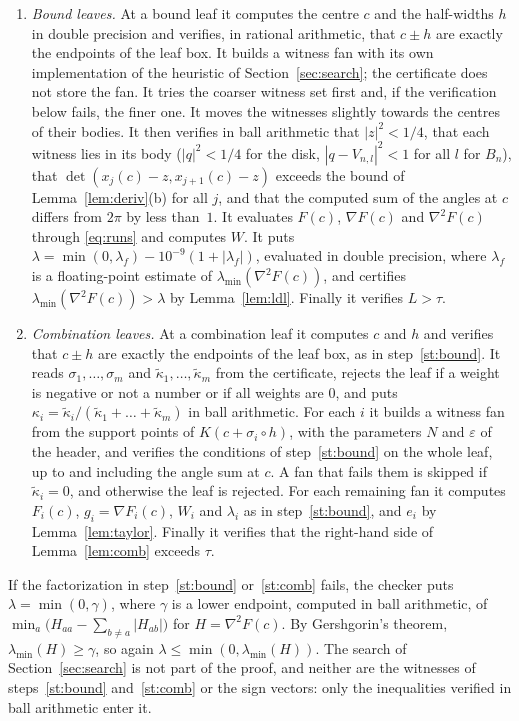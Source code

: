 \documentclass[11pt]{amsart}
\theoremstyle{definition}
\theoremstyle{remark}
\numberwithin{equation}{section}
\newcommand{\lmin}{\lambda_{\min}}
\begin{document}
\begin{enumerate}[label=(\arabic*),leftmargin=*]
\item\label{st:bound} \emph{Bound leaves.} At a bound leaf it computes the centre $c$ and the half-widths $h$ in double precision and verifies, in rational arithmetic, that $c\pm h$ are exactly the endpoints of the leaf box. It builds a witness fan with its own implementation of the heuristic of Section~\ref{sec:search}; the certificate does not store the fan. It tries the coarser witness set first and, if the verification below fails, the finer one. It moves the witnesses slightly towards the centres of their bodies. It then verifies in ball arithmetic that $|z|^2<1/4$, that each witness lies in its body ($|q|^2<1/4$ for the disk, $|q-V_{n,l}|^2<1$ for all $l$ for $B_n$), that $\det(x_j(c)-z,x_{j+1}(c)-z)$ exceeds the bound of Lemma~\ref{lem:deriv}(b) for all $j$, and that the computed sum of the angles at $c$ differs from $2\pi$ by less than~$1$. It evaluates $F(c)$, $\nabla F(c)$ and $\nabla^2F(c)$ through \eqref{eq:runs} and computes $W$. It puts $\lambda=\min(0,\lambda_f)-10^{-9}(1+|\lambda_f|)$, evaluated in double precision, where $\lambda_f$ is a floating-point estimate of $\lmin(\nabla^2F(c))$, and certifies $\lmin(\nabla^2F(c))>\lambda$ by Lemma~\ref{lem:ldl}. Finally it verifies $L>\tau$.
\item\label{st:comb} \emph{Combination leaves.} At a combination leaf it computes $c$ and $h$ and verifies that $c\pm h$ are exactly the endpoints of the leaf box, as in step~\ref{st:bound}. It reads $\sigma_1,\dots,\sigma_m$ and $\tilde\kappa_1,\dots,\tilde\kappa_m$ from the certificate, rejects the leaf if a weight is negative or not a number or if all weights are $0$, and puts $\kappa_i=\tilde\kappa_i/(\tilde\kappa_1+\dots+\tilde\kappa_m)$ in ball arithmetic. For each $i$ it builds a witness fan from the support points of $K(c+\sigma_i\circ h)$, with the parameters $N$ and $\varepsilon$ of the header, and verifies the conditions of step~\ref{st:bound} on the whole leaf, up to and including the angle sum at $c$. A fan that fails them is skipped if $\tilde\kappa_i=0$, and otherwise the leaf is rejected. For each remaining fan it computes $F_i(c)$, $g_i=\nabla F_i(c)$, $W_i$ and $\lambda_i$ as in step~\ref{st:bound}, and $e_i$ by Lemma~\ref{lem:taylor}. Finally it verifies that the right-hand side of Lemma~\ref{lem:comb} exceeds $\tau$.
\end{enumerate}
If the factorization in step~\ref{st:bound} or~\ref{st:comb} fails, the checker puts $\lambda=\min(0,\gamma)$, where $\gamma$ is a lower endpoint, computed in ball arithmetic, of $\min_a\bigl(H_{aa}-\sum_{b\ne a}|H_{ab}|\bigr)$ for $H=\nabla^2F(c)$. By Gershgorin's theorem, $\lmin(H)\ge\gamma$, so again $\lambda\le\min(0,\lmin(H))$. The search of Section~\ref{sec:search} is not part of the proof, and neither are the witnesses of steps~\ref{st:bound} and~\ref{st:comb} or the sign vectors: only the inequalities verified in ball arithmetic enter it.
\end{document}
